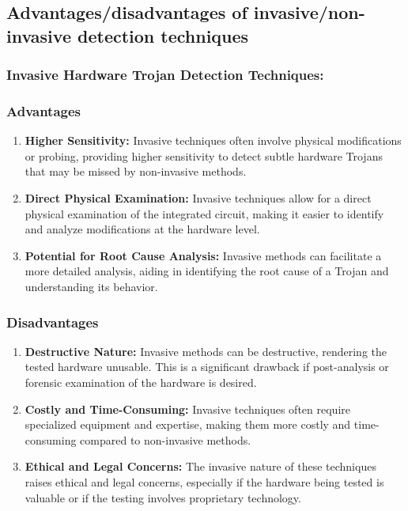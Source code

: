 \subsection{Advantages/disadvantages of invasive/non-invasive detection techniques}
\paragraph*{}
\subsubsection{Invasive Hardware Trojan Detection Techniques:}
\paragraph*{}
\subsubsection{Advantages}
\begin{enumerate}
	\item \textbf{Higher Sensitivity:} Invasive techniques often involve physical modifications or probing, providing higher sensitivity to detect subtle hardware Trojans that may be missed by non-invasive methods.
	\item \textbf{Direct Physical Examination:} Invasive techniques allow for a direct physical examination of the integrated circuit, making it easier to identify and analyze modifications at the hardware level.
	\item \textbf{Potential for Root Cause Analysis:} Invasive methods can facilitate a more detailed analysis, aiding in identifying the root cause of a Trojan and understanding its behavior.
\end{enumerate}
\subsubsection{Disadvantages}
\begin{enumerate}
	\item \textbf{Destructive Nature:} Invasive methods can be destructive, rendering the tested hardware unusable. This is a significant drawback if post-analysis or forensic examination of the hardware is desired.
	\item \textbf{Costly and Time-Consuming:} Invasive techniques often require specialized equipment and expertise, making them more costly and time-consuming compared to non-invasive methods.
	\item\textbf{ Ethical and Legal Concerns:} The invasive nature of these techniques raises ethical and legal concerns, especially if the hardware being tested is valuable or if the testing involves proprietary technology.
\end{enumerate}
